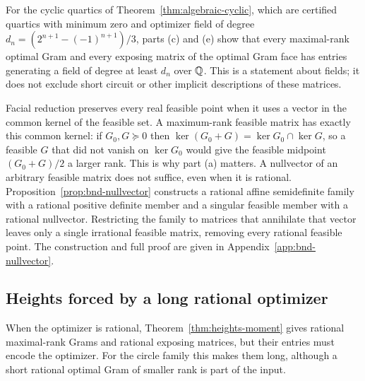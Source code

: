 \begin{remark}
\label{rem:heights-cyclic-fields}
For the cyclic quartics of Theorem~\ref{thm:algebraic-cyclic}, which are
certified quartics with minimum zero and optimizer field of degree
$d_n=(2^{n+1}-(-1)^{n+1})/3$, parts (c) and (e) show that every maximal-rank
optimal Gram and every exposing matrix of the optimal Gram face has entries
generating a field of degree at least $d_n$ over $\mathbb Q$. This is a statement
about fields; it does not exclude short circuit or other implicit
descriptions of these matrices.
\end{remark}

\begin{remark}
\label{rem:heights-nullvector}
Facial reduction preserves every real feasible point when it uses a vector
in the common kernel of the feasible set. A maximum-rank feasible matrix has
exactly this common kernel: if $G_0,G\succeq0$ then
$\ker(G_0+G)=\ker G_0\cap\ker G$, so a feasible $G$ that did not vanish on
$\ker G_0$ would give the feasible midpoint $(G_0+G)/2$ a larger rank. This is
why part (a) matters. A nullvector of an arbitrary feasible matrix does not
suffice, even when it is rational. Proposition~\ref{prop:bnd-nullvector}
constructs a rational affine semidefinite family with a rational positive
definite member and a singular feasible member with a rational nullvector.
Restricting the family to matrices that annihilate that vector leaves only a
single irrational feasible matrix, removing every rational feasible point.
The construction and full proof are given in Appendix~\ref{app:bnd-nullvector}.
\end{remark}

\subsection{Heights forced by a long rational optimizer}
\label{sec:heights-gram-heights}

When the optimizer is rational, Theorem~\ref{thm:heights-moment} gives
rational maximal-rank Grams and rational exposing matrices, but their
entries must encode the optimizer. For the circle family this makes them
long, although a short rational optimal Gram of smaller rank is part of the
input.

